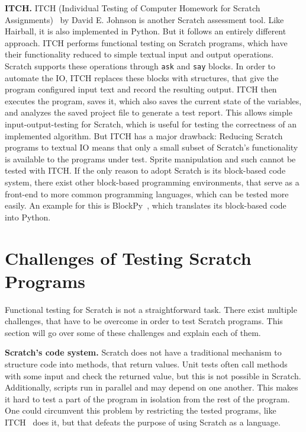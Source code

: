 \textbf{ITCH.}
ITCH (Individual Testing of Computer Homework for Scratch Assignments)~\cite{itch} by David E. Johnson is another Scratch assessment tool.
Like Hairball, it is also implemented in Python.
But it follows an entirely different approach.
ITCH performs functional testing on Scratch programs, which have their functionality reduced to simple textual input and output operations.
Scratch supports these operations through \texttt{ask} and \texttt{say} blocks.
In order to automate the IO, ITCH replaces these blocks with structures, that give the program configured input text and record the resulting output.
ITCH then executes the program, saves it, which also saves the current state of the variables, and analyzes the saved project file to generate a test report.
This allows simple input-output-testing for Scratch, which is useful for testing the correctness of an implemented algorithm.
But ITCH has a major drawback: Reducing Scratch programs to textual IO means that only a small subset of Scratch's functionality is available to the programs under test.
Sprite manipulation and such cannot be tested with ITCH.
If the only reason to adopt Scratch is its block-based code system, there exist other block-based programming environments, that serve as a front-end to more common programming languages, which can be tested more easily.
An example for this is BlockPy~\cite{blockpy}, which translates its block-based code into Python.

\section{Challenges of Testing Scratch Programs}
\label{sec:challenges_of_testing_scratch_programs}

Functional testing for Scratch is not a straightforward task.
There exist multiple challenges, that have to be overcome in order to test Scratch programs.
This section will go over some of these challenges and explain each of them.
\parspace

\textbf{Scratch's code system.}
Scratch does not have a traditional mechanism to structure code into methods, that return values.
Unit tests often call methods with some input and check the returned value, but this is not possible in Scratch.
Additionally, scripts run in parallel and may depend on one another.
This makes it hard to test a part of the program in isolation from the rest of the program.
One could circumvent this problem by restricting the tested programs, like ITCH~\cite{itch} does it,
but that defeats the purpose of using Scratch as a language.
\parspace

